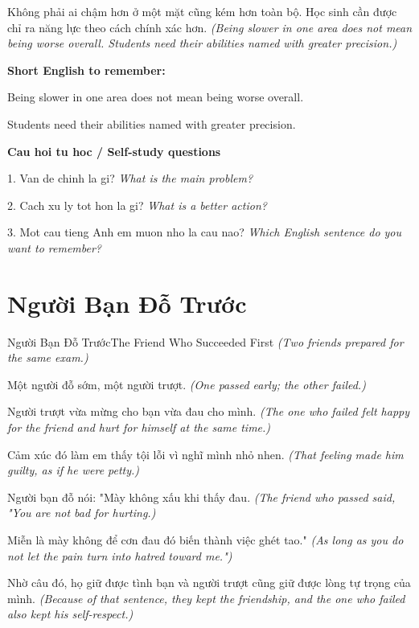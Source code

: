 \begin{baihoc}
Không phải ai chậm hơn ở một mặt cũng kém hơn toàn bộ. Học sinh cần được chỉ ra năng lực theo cách chính xác hơn.
\textit{(Being slower in one area does not mean being worse overall. Students need their abilities named with greater precision.)}
\end{baihoc}

\begin{ghinhoanh}
\textbf{Short English to remember:}

Being slower in one area does not mean being worse overall.

Students need their abilities named with greater precision.

\end{ghinhoanh}

\begin{tuhocnhanh}
\textbf{Cau hoi tu hoc / Self-study questions}

1. Van de chinh la gi? \textit{What is the main problem?}

2. Cach xu ly tot hon la gi? \textit{What is a better action?}

3. Mot cau tieng Anh em muon nho la cau nao? \textit{Which English sentence do you want to remember?}
\end{tuhocnhanh}
\ngancach

\section{Người Bạn Đỗ Trước}
\begin{truyen}{Người Bạn Đỗ Trước}{The Friend Who Succeeded First}
\textit{(Two friends prepared for the same exam.)}

Một người đỗ sớm, một người trượt.
\textit{(One passed early; the other failed.)}

Người trượt vừa mừng cho bạn vừa đau cho mình.
\textit{(The one who failed felt happy for the friend and hurt for himself at the same time.)}

Cảm xúc đó làm em thấy tội lỗi vì nghĩ mình nhỏ nhen.
\textit{(That feeling made him guilty, as if he were petty.)}

Người bạn đỗ nói: "Mày không xấu khi thấy đau.
\textit{(The friend who passed said, "You are not bad for hurting.)}

Miễn là mày không để cơn đau đó biến thành việc ghét tao."
\textit{(As long as you do not let the pain turn into hatred toward me.")}

Nhờ câu đó, họ giữ được tình bạn và người trượt cũng giữ được lòng tự trọng của mình.
\textit{(Because of that sentence, they kept the friendship, and the one who failed also kept his self-respect.)}

\end{truyen}

